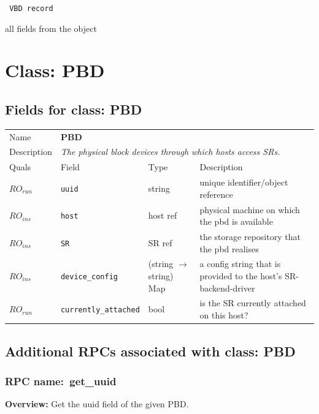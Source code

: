 \vspace{0.3cm}

{\tt 
VBD record
}


all fields from the object
\vspace{0.3cm}
\vspace{0.3cm}
\vspace{0.3cm}

\vspace{1cm}
\newpage
\section{Class: PBD}
\subsection{Fields for class: PBD}
\begin{longtable}{|lllp{}|}
\hline
\multicolumn{1}{|l}{Name} & \multicolumn{3}{l|}{\bf PBD} \\
\multicolumn{1}{|l}{Description} & \multicolumn{3}{l|}{\parbox{11cm}{\em
The physical block devices through which hosts access SRs.}} \\
\hline
Quals & Field & Type & Description \\
\hline
$\mathit{RO}_\mathit{run}$ &  {\tt uuid} & string & unique identifier/object reference \\
$\mathit{RO}_\mathit{ins}$ &  {\tt host} & host ref & physical machine on which the pbd is available \\
$\mathit{RO}_\mathit{ins}$ &  {\tt SR} & SR ref & the storage repository that the pbd realises \\
$\mathit{RO}_\mathit{ins}$ &  {\tt device\_config} & (string $\rightarrow$ string) Map & a config string that is provided to the host's SR-backend-driver \\
$\mathit{RO}_\mathit{run}$ &  {\tt currently\_attached} & bool & is the SR currently attached on this host? \\
\hline
\end{longtable}
\subsection{Additional RPCs associated with class: PBD}
\subsubsection{RPC name:~get\_uuid}

{\bf Overview:} 
Get the uuid field of the given PBD.

